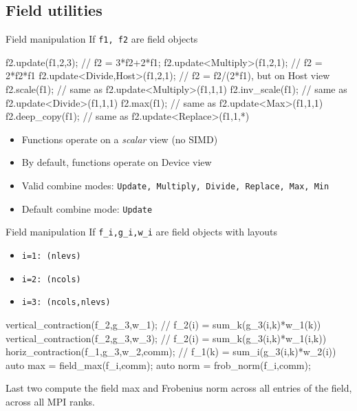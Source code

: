 \documentclass[8pt,NM,theme=angles,number=2023-00000]{sandia-beamer}
\begin{document}
\subsection{Field utilities}
\begin{frame}[fragile]{Field manipulation}
  If \texttt{f1, f2} are field objects

  \vspace{-0.5cm}
  \begin{semiverbatim} \small
    f2.update(f1,2,3);              // f2 = 3*f2+2*f1;
    f2.update<Multiply>(f1,2,1);    // f2 = 2*f2*f1
    f2.update<Divide,Host>(f1,2,1); // f2 = f2/(2*f1), but on Host view
    f2.scale(f1);                   // same as f2.update<Multiply>(f1,1,1)
    f2.inv\_scale(f1);              // same as f2.update<Divide>(f1,1,1)
    f2.max(f1);                     // same as f2.update<Max>(f1,1,1)
    f2.deep\_copy(f1);              // same as f2.update<Replace>(f1,1,*)
  \end{semiverbatim}

  \vspace{-0.5cm}
  \begin{itemize}
    \item Functions operate on a \emph{scalar} view (no SIMD)
    \item By default, functions operate on Device view
    \item Valid combine modes: \texttt{Update, Multiply, Divide, Replace, Max, Min}
    \item Default combine mode: \texttt{Update}
  \end{itemize}
\end{frame}

\begin{frame}[fragile]{Field manipulation}
  If \texttt{f\_i,g\_i,w\_i} are field objects with layouts

  \begin{itemize}
    \item \texttt{i=1: (nlevs)} 
    \item \texttt{i=2: (ncols)} 
    \item \texttt{i=3: (ncols,nlevs)} 
  \end{itemize}

  \vspace{-0.5cm}
  \begin{semiverbatim} \small
    vertical\_contraction(f\_2,g\_3,w\_1); // f\_2(i) = sum\_k(g\_3(i,k)*w\_1(k))
    vertical\_contraction(f\_2,g\_3,w\_3); // f\_2(i) = sum\_k(g\_3(i,k)*w\_1(i,k))
    horiz\_contraction(f\_1,g\_3,w\_2,comm); // f\_1(k) = sum\_i(g\_3(i,k)*w\_2(i))
    auto max = field\_max(f\_i,comm);
    auto norm = frob\_norm(f\_i,comm);
  \end{semiverbatim}
  Last two compute the field max and Frobenius norm across all entries of the field, across all MPI ranks.

\end{frame}
\end{document}
